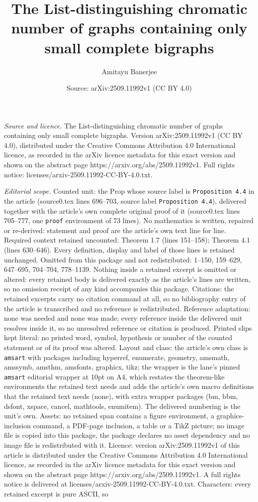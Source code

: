 \documentclass[10pt,a4paper]{amsart}
\title[The List-distinguishing chromatic number of graphs containin]{The List-distinguishing chromatic number of graphs containing only small complete bigraphs}
\author{Amitayu Banerjee}
\date{Source: arXiv:2509.11992v1 (CC BY 4.0)}
\begin{document}
\maketitle

\noindent\emph{Source and licence.} The List-distinguishing chromatic number of graphs containing only small complete bigraphs. Version arXiv:2509.11992v1 (CC BY 4.0), distributed under the Creative Commons Attribution 4.0 International licence, as recorded in the arXiv licence metadata for this exact version and shown on the abstract page https://arxiv.org/abs/2509.11992v1. Full rights notice: licenses/arxiv-2509.11992-CC-BY-4.0.txt.\par\smallskip

\noindent\textit{Editorial scope.} Counted unit: the Prop whose source label is \texttt{Proposition 4.4} in the article (source0.tex lines 696--703, source label \texttt{Proposition 4.4}), delivered together with the article's own complete original proof of it (source0.tex lines 705--777, one \texttt{proof} environment of 73 lines). No mathematics is written, repaired or re-derived: statement and proof are the article's own text line for line. Required context retained uncounted: Theorem 1.7 (lines 151--158); Theorem 4.1 (lines 630--646). Every definition, display and label of those lines is retained unchanged. Omitted from this package and not redistributed: 1--150, 159--629, 647--695, 704--704, 778--1139. Nothing inside a retained excerpt is omitted or altered: every retained body is delivered exactly as the article's lines are written, so no omission receipt of any kind accompanies this package. Citations: the retained excerpts carry no citation command at all, so no bibliography entry of the article is transcribed and no reference is redistributed. Reference adaptation: none was needed and none was made; every reference inside the delivered unit resolves inside it, so no unresolved reference or citation is produced. Printed slips kept literal: no printed word, symbol, hypothesis or number of the counted statement or of its proof was altered. Layout and class: the article's own class is \texttt{amsart} with packages including hyperref, enumerate, geometry, amsmath, amssymb, amsthm, amsfonts, graphicx, tikz; the wrapper is the lane's pinned \texttt{amsart} editorial wrapper at 10pt on A4, which restates the theorem-like environments the retained text needs and adds the article's own macro definitions that the retained text needs (none), with extra wrapper packages (bm, bbm, dsfont, xspace, cancel, mathtools, enumitem). The delivered numbering is the unit's own. Assets: no retained span contains a figure environment, a graphics-inclusion command, a PDF-page inclusion, a table or a TikZ picture; no image file is copied into this package, the package declares no asset dependency and no image file is redistributed with it. Licence: version arXiv:2509.11992v1 of this article is distributed under the Creative Commons Attribution 4.0 International licence, as recorded in the arXiv licence metadata for this exact version and shown on the abstract page https://arxiv.org/abs/2509.11992v1. A full rights notice is delivered at licenses/arxiv-2509.11992-CC-BY-4.0.txt. Characters: every retained excerpt is pure ASCII, so 
\end{document}
